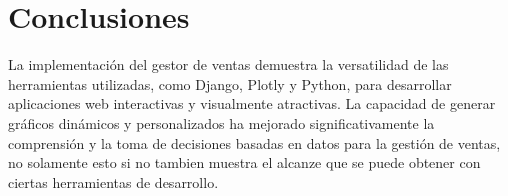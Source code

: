\documentclass[conference]{IEEEtran}
\begin{document}
\section{Conclusiones}

La implementación del gestor de ventas demuestra la versatilidad de las herramientas utilizadas, como Django, Plotly y Python, para desarrollar aplicaciones web interactivas y visualmente atractivas. La capacidad de generar gráficos dinámicos y personalizados ha mejorado significativamente la comprensión y la toma de decisiones basadas en datos para la gestión de ventas, no solamente esto si no tambien muestra el alcanze que se puede obtener con ciertas herramientas de desarrollo. 


\end{document}
